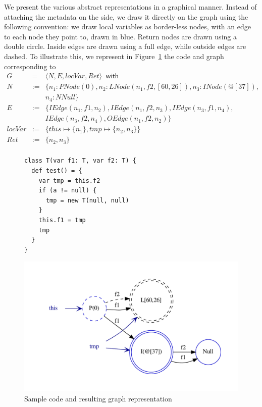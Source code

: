 We present the various abstract representations in a graphical manner. Instead
of attaching the metadata on the side, we draw it directly on the graph using
the following convention: we draw local variables as border-less nodes, with an
edge to each node they point to, drawn in blue. Return nodes are drawn using
a double circle. Inside edges are drawn using a full edge, while
outside edges are dashed. To illustrate this, we represent in
Figure~\ref{fig:pt:graph1} the code and graph corresponding to
\begin{eqnarray*}
      G  &=& \langle N, E, locVar, Ret \rangle ~\textsf{ with } \\
      N &:=& \{ n_1: PNode(0), n_2: LNode(n_1, f2, [60,26]), n_3: INode(@[37]), \\
          && n_4: NNull \} \\
      E &:=& \{ IEdge(n_1, f1, n_2), IEdge(n_1, f2, n_3), IEdge(n_3, f1, n_4), \\
          &&  IEdge(n_3, f2, n_4), OEdge(n_1, f2, n_2) \} \\
 locVar &:=& \{ this \mapsto \{ n_1 \}, tmp \mapsto \{ n_2, n_3 \} \} \\
    Ret &:=& \{ n_2, n_3 \} \\
\end{eqnarray*}

\begin{figure}[h]
    \centering
\begin{minipage}[tl]{0.6\linewidth}
    \centering
\lstset{linewidth=0.6\linewidth}
\begin{lstlisting}
class T(var f1: T, var f2: T) {
  def test() = {
    var tmp = this.f2
    if (a != null) {
      tmp = new T(null, null)
    }
    this.f1 = tmp
    tmp
  }
}
\end{lstlisting}
\end{minipage}
\begin{minipage}[tl]{0.6\linewidth}
    \centering
    \includegraphics[scale=0.6]{images/pt_graph1}
\end{minipage}
    \caption{Sample code and resulting graph representation}
    \label{fig:pt:graph1}
\end{figure}


